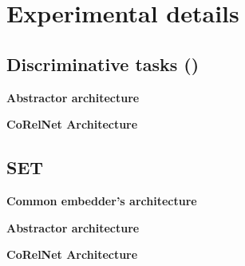 \section{Experimental details}\label{sec:experimental_details}

\subsection{Discriminative tasks ()}

\textbf{Abstractor architecture}

\textbf{CoRelNet Architecture}



\subsection{SET}

\textbf{Common embedder's architecture}

\textbf{Abstractor architecture}

\textbf{CoRelNet Architecture}